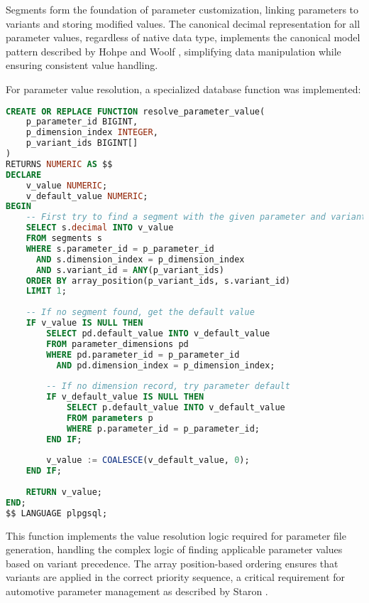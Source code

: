 Segments form the foundation of parameter customization, linking parameters to variants and storing modified values. The canonical decimal representation for all parameter values, regardless of native data type, implements the canonical model pattern described by Hohpe and Woolf \cite{hohpe2002enterprise}, simplifying data manipulation while ensuring consistent value handling.

For parameter value resolution, a specialized database function was implemented:

\begin{lstlisting}[language=SQL, caption={Parameter Resolution Function}, label={lst:parameter-resolution}]
CREATE OR REPLACE FUNCTION resolve_parameter_value(
    p_parameter_id BIGINT,
    p_dimension_index INTEGER,
    p_variant_ids BIGINT[]
)
RETURNS NUMERIC AS $$
DECLARE
    v_value NUMERIC;
    v_default_value NUMERIC;
BEGIN
    -- First try to find a segment with the given parameter and variant
    SELECT s.decimal INTO v_value
    FROM segments s
    WHERE s.parameter_id = p_parameter_id
      AND s.dimension_index = p_dimension_index
      AND s.variant_id = ANY(p_variant_ids)
    ORDER BY array_position(p_variant_ids, s.variant_id)
    LIMIT 1;
    
    -- If no segment found, get the default value
    IF v_value IS NULL THEN
        SELECT pd.default_value INTO v_default_value
        FROM parameter_dimensions pd
        WHERE pd.parameter_id = p_parameter_id
          AND pd.dimension_index = p_dimension_index;
          
        -- If no dimension record, try parameter default
        IF v_default_value IS NULL THEN
            SELECT p.default_value INTO v_default_value
            FROM parameters p
            WHERE p.parameter_id = p_parameter_id;
        END IF;
        
        v_value := COALESCE(v_default_value, 0);
    END IF;
    
    RETURN v_value;
END;
$$ LANGUAGE plpgsql;
\end{lstlisting}

This function implements the value resolution logic required for parameter file generation, handling the complex logic of finding applicable parameter values based on variant precedence. The array position-based ordering ensures that variants are applied in the correct priority sequence, a critical requirement for automotive parameter management as described by Staron \cite{staron2021automotive}.

